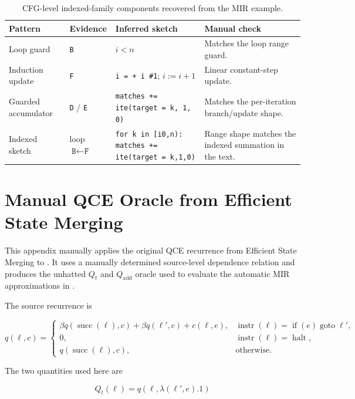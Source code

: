 \documentclass[conference]{IEEEtran}
\newcommand{\tighttable}{\scriptsize\renewcommand{\arraystretch}{1.16}}
\begin{document}
\begin{table}[H]
\caption{CFG-level indexed-family components recovered from the MIR example.}
\label{tab:quantified-pattern-inference}
\centering
\tighttable
\begin{tabularx}{\textwidth}{@{}lY Y Y@{}}
\toprule
Pattern & Evidence & Inferred sketch & Manual check \\
\midrule
Loop guard
& \texttt{B}
& \(i < n\)
& Matches the loop range guard. \\
Induction update
& \texttt{F}
& \texttt{i = + i \#1}; \(i := i + 1\)
& Linear constant-step update. \\
Guarded accumulator
& \texttt{D} / \texttt{E}
& \texttt{matches += ite(target = k, 1, 0)}
& Matches the per-iteration branch/update shape. \\
Indexed sketch
& loop \(\texttt{B} \leftarrow \texttt{F}\)
& \texttt{for k in [i0,n): matches += ite(target = k,1,0)}
& Range shape matches the indexed summation in the text. \\
\bottomrule
\end{tabularx}
\end{table}
\endgroup

\clearpage

\section{Manual QCE Oracle from Efficient State Merging}
\label{app:qce-manual-baseline}

This appendix manually applies the original QCE recurrence from Efficient
State Merging to  \cite{efficient-merging}. It uses
a manually determined source-level dependence relation and produces the
unhatted \(Q_t\) and \(Q_{\mathrm{add}}\) oracle used to evaluate the automatic
MIR approximations in .

The source recurrence is

\[
q(\ell,c)=
\begin{cases}
\beta q(\operatorname{succ}(\ell),c)
+\beta q(\ell',c)
+c(\ell,e),
& \operatorname{instr}(\ell)=\operatorname{if}(e)\operatorname{goto}\ell',
\\
0, & \operatorname{instr}(\ell)=\operatorname{halt},
\\
q(\operatorname{succ}(\ell),c), & \text{otherwise}.
\end{cases}
\]

The two quantities used here are

\[
Q_t(\ell)=q\left(\ell,\lambda(\ell',e).1\right)
\]
\end{document}
